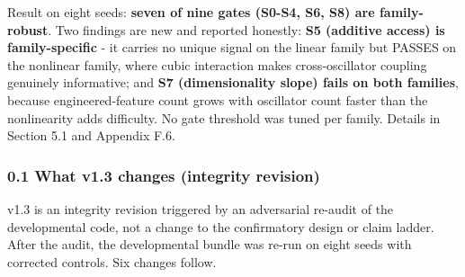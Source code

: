 \documentclass[
  11pt,
]{article}
\begin{document}
Result on eight seeds: \textbf{seven of nine gates
(S0-S4, S6, S8) are family-robust}. Two findings are
new and reported honestly: \textbf{S5 (additive access)
is family-specific} - it carries no unique signal on
the linear family but PASSES on the nonlinear family,
where cubic interaction makes cross-oscillator coupling
genuinely informative; and \textbf{S7 (dimensionality
slope) fails on both families}, because
engineered-feature count grows with oscillator count
faster than the nonlinearity adds difficulty. No gate
threshold was tuned per family. Details in Section 5.1
and Appendix F.6.

\subsubsection{0.1 What v1.3 changes (integrity
revision)}\label{what-v1.3-changes-integrity-revision}

v1.3 is an integrity revision triggered by an
adversarial re-audit of the developmental code, not a
change to the confirmatory design or claim ladder.
After the audit, the developmental bundle was re-run on
eight seeds with corrected controls. Six changes
follow.
\end{document}
